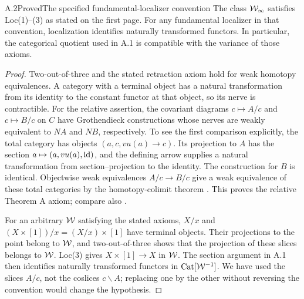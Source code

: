 \begin{claim}{A.2}{Proved}{The specified fundamental-localizer convention}
The class $\mathcal W_\infty$ satisfies Loc(1)--(3) as stated on the first page. For any fundamental localizer in that convention, localization identifies naturally transformed functors. In particular, the categorical quotient used in A.1 is compatible with the variance of those axioms.
\end{claim}
\begin{proof}
Two-out-of-three and the stated retraction axiom hold for weak homotopy equivalences. A category with a terminal object has a natural transformation from its identity to the constant functor at that object, so its nerve is contractible. For the relative assertion, the covariant diagrams $c\mapsto A/c$ and $c\mapsto B/c$ on $C$ have Grothendieck constructions whose nerves are weakly equivalent to $NA$ and $NB$, respectively. To see the first comparison explicitly, the total category has objects $(a,c,vu(a)\to c)$. Its projection to $A$ has the section $a\mapsto(a,vu(a),\mathrm{id})$, and the defining arrow supplies a natural transformation from section--projection to the identity. The construction for $B$ is identical. Objectwise weak equivalences $A/c\to B/c$ give a weak equivalence of these total categories by the homotopy-colimit theorem \citep[Theorem~26.8 and Corollary~26.9]{ChacholskiScherer2001}. This proves the relative Theorem A axiom; compare also \citet[\S1, Theorem~A]{Quillen1973}.

For an arbitrary $\mathcal W$ satisfying the stated axioms, $X/x$ and $(X\times[1])/x=(X/x)\times[1]$ have terminal objects. Their projections to the point belong to $\mathcal W$, and two-out-of-three shows that the projection of these slices belongs to $\mathcal W$. Loc(3) gives $X\times[1]\to X$ in $\mathcal W$. The section argument in A.1 then identifies naturally transformed functors in $\mathrm{Cat}[\mathcal W^{-1}]$. We have used the slices $A/c$, not the coslices $c\backslash A$; replacing one by the other without reversing the convention would change the hypothesis.
\end{proof}

